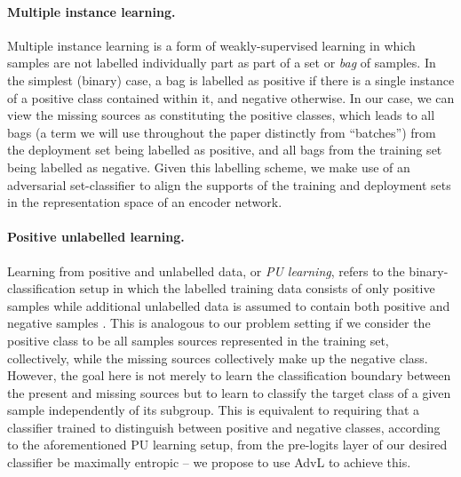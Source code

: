\paragraph{Multiple instance learning.}
%
Multiple instance learning \citep{maron1998framework} is a form of weakly-supervised learning in
which samples are not labelled individually part as part of a set or \emph{bag} of samples.
%
In the simplest (binary) case, a bag is labelled as positive if there is a single instance of a
positive class contained within it, and negative otherwise.
%
In our case, we can view the missing sources as constituting the positive classes, which leads to
all bags (a term we will use throughout the paper distinctly from ``batches'') from the deployment
set being labelled as positive, and all bags from the training set being labelled as negative.
%
Given this labelling scheme, we make use of an adversarial set-classifier to align the supports of
the training and deployment sets in the representation space of an encoder network.
%

\paragraph{Positive unlabelled learning.}
%
Learning from positive and unlabelled data, or \emph{PU learning}, refers to the
binary-classification setup in which the labelled training data consists of only positive samples
while additional unlabelled data is assumed to contain both positive and negative samples
\citep{liu2002partially, liu2003building, bekker2020learning}. 
%
This is analogous to our problem setting if we consider the positive class to be all samples
sources represented in the training set, collectively, while the missing sources collectively make
up the negative class. 
%
However, the goal here is not merely to learn the classification boundary between the present and
missing sources but to learn to classify the target class of a given sample independently of its
subgroup.
%
This is equivalent to requiring that a classifier trained to distinguish between positive and
negative classes, according to the aforementioned PU learning setup, from the pre-logits layer of
our desired classifier be maximally entropic -- we propose to use \acl{AdvL} to achieve this.
%
